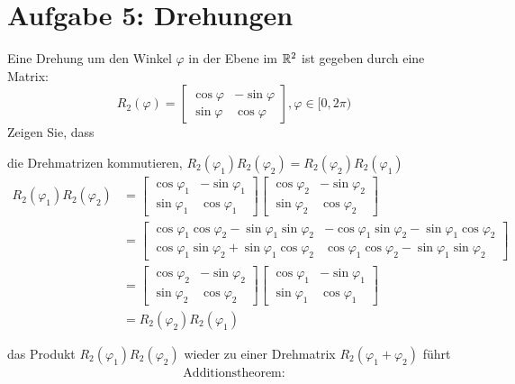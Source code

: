 \section*{Aufgabe 5: Drehungen}
Eine Drehung um den Winkel $\varphi$ in der Ebene im $\mathbb{R}^2$ ist gegeben durch eine Matrix:
\[R_2(\varphi) = \begin{bmatrix}
\cos \varphi & -\sin \varphi\\
\sin \varphi & \cos \varphi
\end{bmatrix}, \varphi \in [0, 2\pi)\]
Zeigen Sie, dass
\begin{enumeralph}
	\item die Drehmatrizen kommutieren, $R_2(\varphi_1)R_2(\varphi_2) =R_2(\varphi_2)R_2(\varphi_1)$
	\begin{align*}
	R_2(\varphi_1)R_2(\varphi_2)&=\begin{bmatrix}
	\cos \varphi_1 & -\sin \varphi_1\\
	\sin \varphi_1 & \cos \varphi_1
	\end{bmatrix}\begin{bmatrix}
	\cos \varphi_2 & -\sin \varphi_2\\
	\sin \varphi_2 & \cos \varphi_2
	\end{bmatrix}\\
	&=\begin{bmatrix}
	\cos \varphi_1 \cos \varphi_2 - \sin \varphi_1 \sin \varphi_2 & -\cos \varphi_1 \sin \varphi_2 - \sin \varphi_1 \cos \varphi_2\\
	\cos \varphi_1 \sin \varphi_2 + \sin \varphi_1 \cos \varphi_2 &\cos \varphi_1 \cos \varphi_2 - \sin \varphi_1 \sin \varphi_2 
	\end{bmatrix}\\
	&=\begin{bmatrix}
		\cos \varphi_2 & -\sin \varphi_2\\
		\sin \varphi_2 & \cos \varphi_2
		\end{bmatrix}\begin{bmatrix}
		\cos \varphi_1 & -\sin \varphi_1\\
		\sin \varphi_1 & \cos \varphi_1
	\end{bmatrix}\\
	&=R_2(\varphi_2)R_2(\varphi_1)
	\end{align*}
	\item das Produkt $R_2(\varphi_1)R_2(\varphi_2)$ wieder zu einer Drehmatrix $R_2(\varphi_1+ \varphi_2)$ führt
	\begin{align*}
	\text{Additionstheorem:}\\

\end{align*}
\end{enumeralph}

